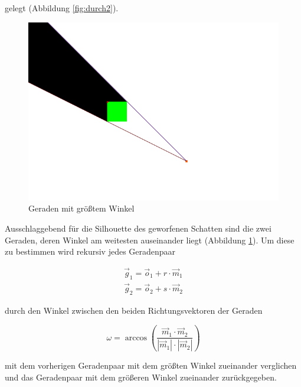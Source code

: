 gelegt (Abbildung \ref{fig:durch2}).

\begin{figure}[t]
	\centering
	\includegraphics[width=\columnwidth]{images/durchfuehrung_4.png}
	\caption{Geraden mit größtem Winkel}
	\label{fig:durch3}
\end{figure}

Ausschlaggebend für die Silhouette des geworfenen Schatten sind die zwei Geraden, deren Winkel am weitesten auseinander liegt (Abbildung \ref{fig:durch3}). Um diese zu bestimmen wird rekursiv jedes Geradenpaar

\begin{equation}
  \begin{split}
	\vec{g}_1 = \vec{o}_1 + r \cdot \vec{m}_1 \\
	\vec{g}_2 = \vec{o}_2 + s \cdot \vec{m}_2
  \end{split}
\end{equation}

durch den Winkel zwischen den beiden Richtungsvektoren der Geraden

\begin{equation}
	\omega = \arccos{\left(\frac{\vec{m}_1 \cdot \vec{m}_2}{|\vec{m}_1| \cdot |\vec{m}_2|} \right)}
\end{equation}

mit dem vorherigen Geradenpaar mit dem größten Winkel zueinander verglichen und das Geradenpaar mit dem größeren Winkel zueinander zurückgegeben.

